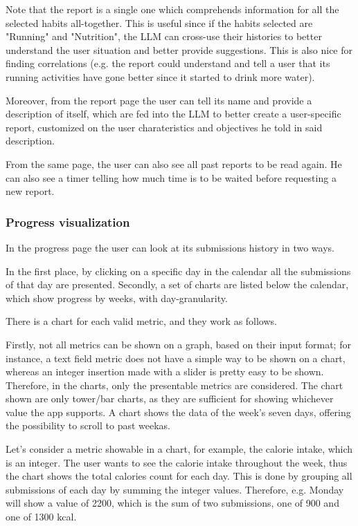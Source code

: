 \documentclass{article}
\begin{document}
Note that the report is a single one which comprehends information for all the selected habits all-together.
This is useful since if the habits selected are "Running" and "Nutrition", the LLM can cross-use their histories to better understand the user situation and better provide suggestions.
This is also nice for finding correlations (e.g. the report could understand and tell a user that its running activities have gone better since it started to drink more water).

Moreover, from the report page the user can tell its name and provide a description of itself, which are fed into the LLM to better create a user-specific report, customized on the user charateristics and objectives he told in said description.

From the same page, the user can also see all past reports to be read again.
He can also see a timer telling how much time is to be waited before requesting a new report.

\subsubsection{Progress visualization}

In the progress page the user can look at its submissions history in two ways.

In the first place, by clicking on a specific day in the calendar all the submissions of that day are presented.
Secondly, a set of charts are listed below the calendar, which show progress by weeks, with day-granularity.

There is a chart for each valid metric, and they work as follows.

Firstly, not all metrics can be shown on a graph, based on their input format; for instance, a text field metric does not have a simple way to be shown on a chart, whereas an integer insertion made with a slider is pretty easy to be shown.
Therefore, in the charts, only the presentable metrics are considered.
The chart shown are only tower/bar charts, as they are sufficient for showing whichever value the app supports.
A chart shows the data of the week's seven days, offering the possibility to scroll to past weekas.

Let's consider a metric showable in a chart, for example, the calorie intake, which is an integer.
The user wants to see the calorie intake throughout the week, thus the chart shows the total calories count for each day.
This is done by grouping all submissions of each day by summing the integer values.
Therefore, e.g. Monday will show a value of 2200, which is the sum of two submissions, one of 900 and one of 1300 kcal.
\end{document}
